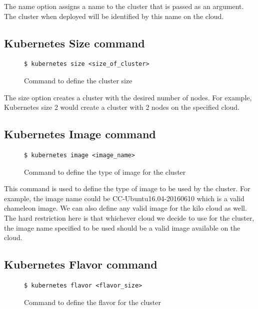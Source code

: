 \documentclass[9pt,twocolumn,twoside]{../../styles/osajnl}
\begin{document}
{The name option assigns a name to the cluster that is passed as an
argument. The cluster when deployed will be identified by this name on the
cloud.
\subsection{Kubernetes Size command}

\begin{figure}[H]
\begin{verbatim}
$ kubernetes size <size_of_cluster>
\end{verbatim}
\caption{Command to define the cluster size}
\vspace{-4mm}
\label{Command to define the cluster size}
\end{figure}

The size option creates a cluster with the desired number of
nodes. For example, Kubernetes size 2 would create a cluster with 2
nodes on the specified cloud.

\subsection{Kubernetes Image command}
\begin{figure}[H]
\begin{verbatim}
$ kubernetes image <image_name>
\end{verbatim}
\caption{Command to define the type of image for the cluster}
\vspace{-4mm}
\label{Command to define the type of image for the cluster}
\end{figure}

This command is used to define the type of image to be used by the
cluster. For example, the image name could be CC-Ubuntu16.04-20160610
which is a valid chameleon image. We can also define any valid image
for the kilo cloud as well. The hard restriction here is that
whichever cloud we decide to use for the cluster, the image name
specified to be used should be a valid image available on the cloud.

\subsection{Kubernetes Flavor command}
\begin{figure}[H]
\begin{verbatim}
$ kubernetes flavor <flavor_size>
\end{verbatim}
\caption{Command to define the flavor for the cluster}
\vspace{-4mm}
\label{Command to define the flavor for the cluster}
\end{figure}

}
\end{document}
